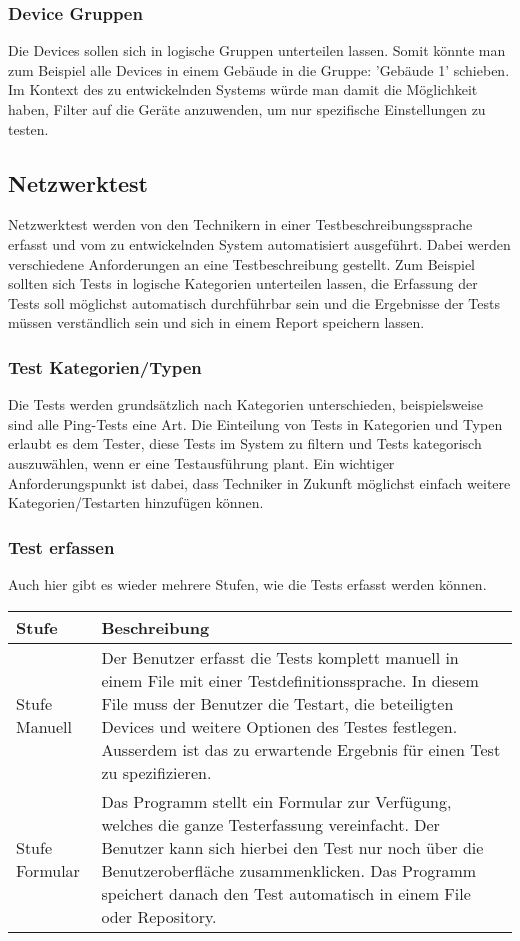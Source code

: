 \documentclass[
	ngerman,
	toc=listof, %
	toc=bibliography, %
	footnotes=multiple, %
	parskip=half, %
	numbers=noendperiod %
]{scrartcl}
\begin{document}
		\subsubsection{Device Gruppen}
			Die Devices sollen sich in logische Gruppen unterteilen lassen. Somit könnte man zum Beispiel alle Devices in einem Gebäude in die Gruppe: 'Gebäude 1' schieben.
			Im Kontext des zu entwickelnden Systems würde man damit die Möglichkeit haben, Filter auf die Geräte anzuwenden, um nur spezifische Einstellungen zu testen.

	\subsection{Netzwerktest}
		Netzwerktest werden von den Technikern in einer Testbeschreibungssprache erfasst und vom zu entwickelnden System automatisiert ausgeführt.
		Dabei werden verschiedene Anforderungen an eine Testbeschreibung gestellt. Zum Beispiel sollten sich Tests in logische Kategorien unterteilen lassen, die Erfassung der Tests soll möglichst automatisch durchführbar sein und die Ergebnisse der Tests müssen verständlich sein und sich in einem Report speichern lassen.

		
		\subsubsection{Test Kategorien/Typen}
			Die Tests werden grundsätzlich nach Kategorien unterschieden, beispielsweise sind alle Ping-Tests eine Art.
			Die Einteilung von Tests in Kategorien und Typen erlaubt es dem Tester, diese Tests im System zu filtern und Tests kategorisch auszuwählen, wenn er eine Testausführung plant.
			Ein wichtiger Anforderungspunkt ist dabei, dass Techniker in Zukunft möglichst einfach weitere Kategorien/Testarten hinzufügen können.

		\subsubsection{Test erfassen}
			Auch hier gibt es wieder mehrere Stufen, wie die Tests erfasst werden können.\\

			\begin{tabularx}{\textwidth}{lX}
				\toprule
				Stufe & Beschreibung\\
				\midrule
				Stufe Manuell & Der Benutzer erfasst die Tests komplett manuell in einem File mit einer Testdefinitionssprache. In diesem File muss der Benutzer die Testart, die beteiligten Devices und weitere Optionen des Testes festlegen. Ausserdem ist das zu erwartende Ergebnis für einen Test zu spezifizieren. \\
				\midrule
				Stufe Formular & Das Programm stellt ein Formular zur Verfügung, welches die ganze Testerfassung vereinfacht. Der Benutzer kann sich hierbei den Test nur noch über die Benutzeroberfläche zusammenklicken. Das Programm speichert danach den Test automatisch in einem File oder Repository. \\
				\bottomrule
			\end{tabularx}
\end{document}
